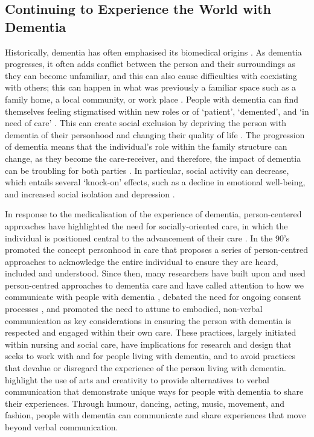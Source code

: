 \subsection{Continuing to Experience the World with Dementia}
\label{Context:Dementia}
Historically, dementia has often emphasised its biomedical origins \citep{lyman_bringing_1989}. As dementia progresses, it often adds conflict between the person and their surroundings as they can become unfamiliar, and this can also cause difficulties with coexisting with others; this can happen in what was previously a familiar space such as a family home, a local community, or work place \citep{langdon_making_2007}. People with dementia can find themselves feeling stigmatised within new roles or of `patient', `demented', and `in need of care' \citep{cohen-mansfield_utilization_2006}. This can create social exclusion by depriving the person with dementia of their personhood and changing their quality of life \citep{lawrence_improving_2012}. The progression of dementia means that the individual's role within the family structure can change, as they become the care-receiver, and therefore, the impact of dementia can be troubling for both parties \citep{dupuis_moving_2012}. In particular, social activity can decrease, which entails several `knock-on' effects, such as a decline in emotional well-being, and increased social isolation and depression \citep{bartlett_citizenship_2014}. 

In response to the medicalisation of the experience of dementia, person-centered approaches have highlighted the need for socially-oriented care, in which the individual is positioned central to the advancement of their care \citep{bond_medicalization_1992,manthorpe_person-centered_2016}. In the 90's \cite{kitwood_towards_1992} promoted the concept personhood in care that proposes a series of person-centred approaches to acknowledge the entire individual to ensure they are heard, included and understood. Since then, many researchers have built upon and used person-centred approaches to dementia care and have called attention to how we communicate with people with dementia \citep{oyebode_mental_2005}, debated the need for ongoing consent processes \citep{dewing_participatory_2007}, and promoted the need to attune to embodied, non-verbal communication \citep{group_patron_2019, twigg_dress_2013} as key considerations in ensuring the person with dementia is respected and engaged within their own care. These practices, largely initiated within nursing and social care, have implications for research and design that seeks to work with and for people living with dementia, and to avoid practices that devalue or disregard the experience of the person living with dementia. \cite{john_killick_claire_craig_creativity_2012} highlight the use of arts and creativity to provide alternatives to verbal communication that demonstrate unique ways for people with dementia to share their experiences. Through humour, dancing, acting, music, movement, and fashion, people with dementia can communicate and share experiences that move beyond verbal communication.


